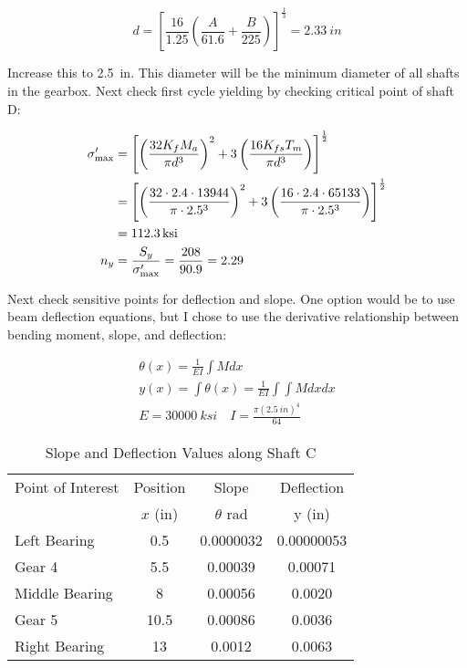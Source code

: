 \documentclass[titlepage]{article} %
\begin{document}
$$d = \left[\frac{16}{1.25}\left(\frac{A}{61.6}+\frac{B}{225}\right)\right]^{\frac{1}{3}} = \SI{2.33}{in}$$

\noindent Increase this to \SI{2.5}{in}. This diameter will be the minimum
diameter of all shafts in the gearbox. Next check first cycle yielding by
checking critical point of shaft D:

\begin{align*}
    \sigma'_\textup{max} &= \left[\left(\frac{32 K_f M_a}{\pi d^3}\right)^2 + 3 \left(\frac{16 K_{fs} T_m}{\pi d^3}\right) \right]^\frac{1}{2}\\
                         &= \left[\left(\frac{32 \cdot 2.4 \cdot 13944}{\pi \cdot 2.5^3}\right)^2 + 3 \left(\frac{16 \cdot 2.4 \cdot 65133}{\pi \cdot 2.5^3}\right) \right]^\frac{1}{2}\\
                         &= \SI{112.3}{ksi} \\
    n_y &= \frac{S_y}{\sigma'_\textup{max}} = \frac{208}{90.9} = 2.29
\end{align*}

Next check sensitive points for deflection and slope. One option would be to use beam deflection equations, but I chose to use the 
derivative relationship between bending moment, slope, and deflection:

\begin{gather*}
    \theta(x) = \frac{1}{EI}\int{Mdx} \\
    y(x) = \int{\theta(x)} = \frac{1}{EI}\int{\int{Mdx} dx} \\
    E = \SI{30000}{ksi} \quad I = \frac{\pi(\SI{2.5}{in})^4}{64}
\end{gather*}


\begin{table}[h]
    \centering
    \begin{threeparttable}
        \caption{Slope and Deflection Values along Shaft C}
        \vspace{0.25cm}
        
        \begin{tabular}{lccc}
            \toprule
            Point of Interest & Position  & Slope  & Deflection\\
              & $x$ (\unit{in}) & $\theta$ \unit{rad} & y (\unit{in})\\
            \midrule
            Left Bearing   & 0.5  & 0.0000032 &  0.00000053\\
            Gear 4         & 5.5  & 0.00039 & 0.00071\\
            Middle Bearing & 8    & 0.00056 & 0.0020 \\
            Gear 5         & 10.5 & 0.00086 & 0.0036\\
            Right Bearing  & 13   & 0.0012 & 0.0063 \\
            \bottomrule
        \end{tabular}
        \label{tab:shaftCdeflect}
    \end{threeparttable}
\end{table}
\end{document}
